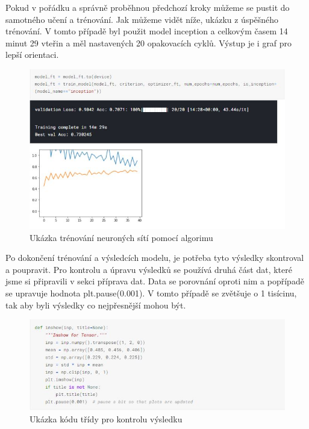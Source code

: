 \documentclass[journal]{IEEEtran}
\begin{document}
Pokud v pořádku a správně proběhnou předchozí kroky můžeme se pustit do samotného učení a trénování. Jak můžeme vidět níže, ukázku z úspěšného trénování. V tomto případě byl použit model inception a celkovým časem 14 minut 29 vteřin a měl nastavených 20 opakovacích cyklů. Výstup je i graf pro lepší orientaci. 

\begin{figure}[h!]
  \includegraphics[width=\linewidth]{images/training.JPG}
  \caption{Ukázka trénování neuroných sítí pomocí algorimu}
\end{figure}

Po dokončení trénování a výsledcích modelu, je potřeba tyto výsledky skontroval a poupravit. Pro kontrolu a úpravu výsledků se používá druhá část dat, které jsme si připravili v sekci příprava dat. Data se porovnání oproti nim a popřípadě se upravuje hodnota  plt.pause(0.001). V tomto případě se zvětšuje o 1 tisícinu, tak aby byli výsledky co nejpřesnější mohou být. 

\begin{figure}[h!]
  \includegraphics[width=\linewidth]{images/eval.JPG}
  \caption{Ukázka kódu třídy pro kontrolu výsledku}
\end{figure}
\end{document}
